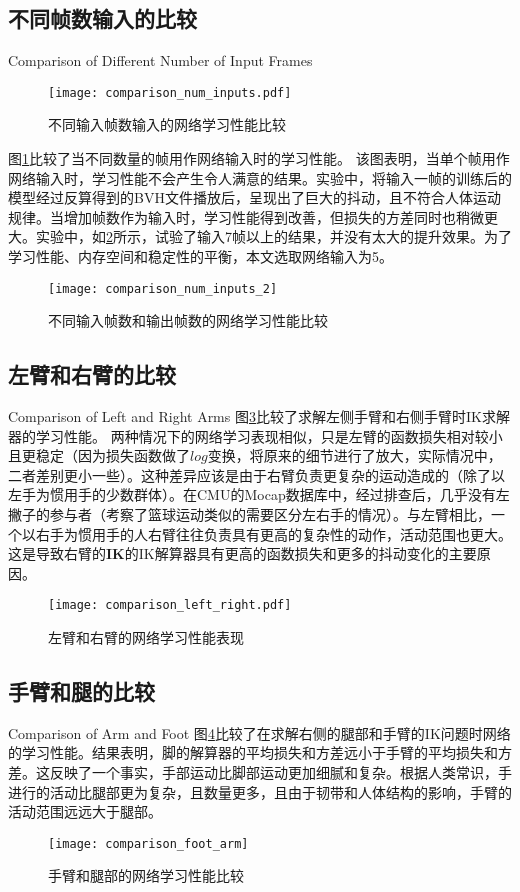 \subsection{不同帧数输入的比较}{Comparison of Different Number of Input Frames}
\label{sec:different_nums}
\begin{figure}[!htbp]
	\centering
	\texttt{[image: comparison\_num\_inputs.pdf]}
	\caption[]{\label{fig:comparison_num_inputs}
		不同输入帧数输入的网络学习性能比较
	}
\end{figure}
图\ref{fig:comparison_num_inputs}比较了当不同数量的帧用作网络输入时的学习性能。 该图表明，当单个帧用作网络输入时，学习性能不会产生令人满意的结果。实验中，将输入一帧的训练后的模型经过反算得到的BVH文件播放后，呈现出了巨大的抖动，且不符合人体运动规律。当增加帧数作为输入时，学习性能得到改善，但损失的方差同时也稍微更大。实验中，如\cref{fig:comparison_num_inputs2}所示，试验了输入7帧以上的结果，并没有太大的提升效果。为了学习性能、内存空间和稳定性的平衡，本文选取网络输入为5。
\begin{figure}[!htbp]
	\centering
	\texttt{[image: comparison\_num\_inputs\_2]}
	\caption[]{\label{fig:comparison_num_inputs2}
		不同输入帧数和输出帧数的网络学习性能比较
	}
\end{figure}
\subsection{左臂和右臂的比较}{Comparison of Left and Right Arms}
图\ref{fig:comparison_left_right}比较了求解左侧手臂和右侧手臂时IK求解器的学习性能。
两种情况下的网络学习表现相似，只是左臂的函数损失相对较小且更稳定（因为损失函数做了$log$变换，将原来的细节进行了放大，实际情况中，二者差别更小一些）。这种差异应该是由于右臂负责更复杂的运动造成的（除了以左手为惯用手的少数群体）。在CMU的Mocap数据库中，经过排查后，几乎没有左撇子的参与者（考察了篮球运动类似的需要区分左右手的情况）。与左臂相比，一个以右手为惯用手的人右臂往往负责具有更高的复杂性的动作，活动范围也更大。这是导致右臂的$\mathbf{IK}$的IK解算器具有更高的函数损失和更多的抖动变化的主要原因。
\begin{figure}[!htbp]
	\centering
	\texttt{[image: comparison\_left\_right.pdf]}
	\caption[]{\label{fig:comparison_left_right}
		左臂和右臂的网络学习性能表现
	}
\end{figure}
\subsection{手臂和腿的比较}{Comparison of Arm and Foot}
图\ref{fig:comparison_foot_arm}比较了在求解右侧的腿部和手臂的IK问题时网络的学习性能。结果表明，脚的解算器的平均损失和方差远小于手臂的平均损失和方差。这反映了一个事实，手部运动比脚部运动更加细腻和复杂。根据人类常识，手进行的活动比腿部更为复杂，且数量更多，且由于韧带和人体结构的影响，手臂的活动范围远远大于腿部。
\begin{figure}[!htbp]
	\centering
	\texttt{[image: comparison\_foot\_arm]}
	\caption[]{\label{fig:comparison_foot_arm}
		手臂和腿部的网络学习性能比较
	}
\end{figure}
